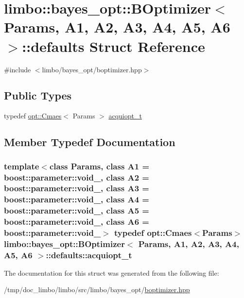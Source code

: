 \hypertarget{structlimbo_1_1bayes__opt_1_1_b_optimizer_1_1defaults}{}\section{limbo\+:\+:bayes\+\_\+opt\+:\+:B\+Optimizer$<$ Params, A1, A2, A3, A4, A5, A6 $>$\+:\+:defaults Struct Reference}
\label{structlimbo_1_1bayes__opt_1_1_b_optimizer_1_1defaults}


{\ttfamily \#include $<$limbo/bayes\+\_\+opt/boptimizer.\+hpp$>$}

\subsection*{Public Types}
\begin{DoxyCompactItemize}
\item 
typedef \hyperlink{structlimbo_1_1opt_1_1_cmaes}{opt\+::\+Cmaes}$<$ Params $>$ \hyperlink{structlimbo_1_1bayes__opt_1_1_b_optimizer_1_1defaults_a4eb44d2abad01f5ef0206b7c5c595c7b}{acquiopt\+\_\+t}
\end{DoxyCompactItemize}


\subsection{Member Typedef Documentation}
\hypertarget{structlimbo_1_1bayes__opt_1_1_b_optimizer_1_1defaults_a4eb44d2abad01f5ef0206b7c5c595c7b}{}
\subsubsection[{acquiopt\+\_\+t}]{\setlength{\rightskip}{0pt plus 5cm}template$<$class Params, class A1 = boost\+::parameter\+::void\+\_\+, class A2 = boost\+::parameter\+::void\+\_\+, class A3 = boost\+::parameter\+::void\+\_\+, class A4 = boost\+::parameter\+::void\+\_\+, class A5 = boost\+::parameter\+::void\+\_\+, class A6 = boost\+::parameter\+::void\+\_\+$>$ typedef {\bf opt\+::\+Cmaes}$<$Params$>$ {\bf limbo\+::bayes\+\_\+opt\+::\+B\+Optimizer}$<$ Params, A1, A2, A3, A4, A5, A6 $>$\+::{\bf defaults\+::acquiopt\+\_\+t}}\label{structlimbo_1_1bayes__opt_1_1_b_optimizer_1_1defaults_a4eb44d2abad01f5ef0206b7c5c595c7b}


The documentation for this struct was generated from the following file\+:\begin{DoxyCompactItemize}
\item 
/tmp/doc\+\_\+limbo/limbo/src/limbo/bayes\+\_\+opt/\hyperlink{boptimizer_8hpp}{boptimizer.\+hpp}\end{DoxyCompactItemize}
